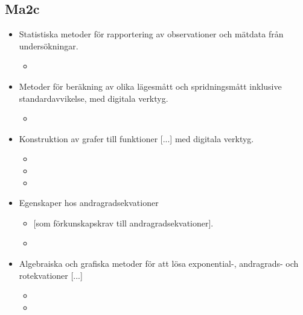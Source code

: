 \subsection*{Ma2c}
\begin{itemize}
\item Statistiska metoder för rapportering av observationer och mätdata från undersökningar.
	\begin{itemize}
	\item {} 
	\end{itemize}
\item Metoder för beräkning av olika lägesmått och spridningsmått inklusive standardavvikelse, med digitala verktyg.
	\begin{itemize}
	\item {} 
	\end{itemize}
\item Konstruktion av grafer till funktioner [...] med digitala verktyg.
	\begin{itemize}
	\item {} 
	\item {} 
	\item {} 
	\end{itemize}
	\newpage
\item Egenskaper hos andragradsekvationer
	\begin{itemize}
	\item {} {\color{myBlue}[som förkunskapskrav till andragradsekvationer].}
	\item {} 
	\end{itemize}
\item Algebraiska och grafiska metoder för att lösa exponential-, andragrads- och rotekvationer [...]
	\begin{itemize}
	\item {} 
	\item {} 
	\end{itemize}
\end{itemize}

